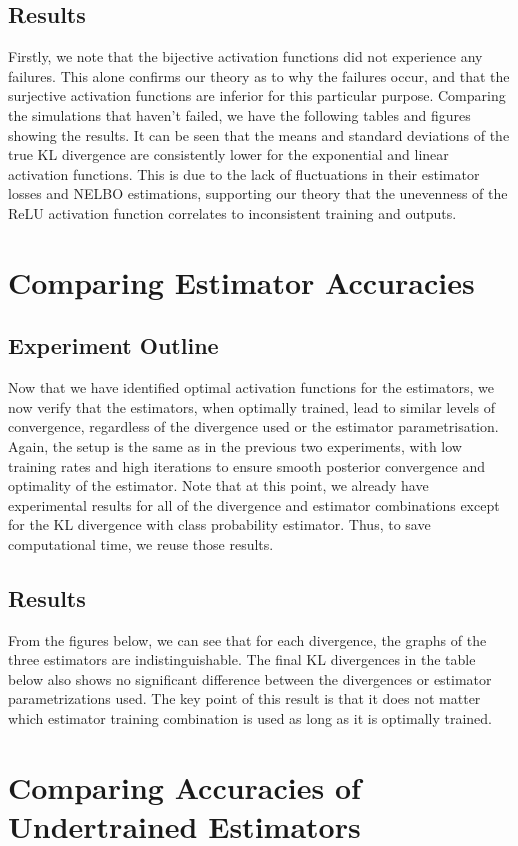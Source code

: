 \documentclass[honours,12pt]{unswthesis}
\numberwithin{equation}{section}
\theoremstyle{definition}
\begin{document}
\subsection{Results}
Firstly, we note that the bijective activation functions did not experience any failures. This alone confirms our theory as to why the failures occur, and that the surjective activation functions are inferior for this particular purpose. Comparing the simulations that haven't failed, we have the following tables and figures showing the results. It can be seen that the means and standard deviations of the true KL divergence are consistently lower for the exponential and linear activation functions. This is due to the lack of fluctuations in their estimator losses and NELBO estimations, supporting our theory that the unevenness of the ReLU activation function correlates to inconsistent training and outputs.
\newpage
\section{Comparing Estimator Accuracies}
\subsection{Experiment Outline}
Now that we have identified optimal activation functions for the estimators, we now verify that the estimators, when optimally trained, lead to similar levels of convergence, regardless of the divergence used or the estimator parametrisation. Again, the setup is the same as in the previous two experiments, with low training rates and high iterations to ensure smooth posterior convergence and optimality of the estimator. Note that at this point, we already have experimental results for all of the divergence and estimator combinations except for the KL divergence with class probability estimator. Thus, to save computational time, we reuse those results.
\subsection{Results}
From the figures below, we can see that for each divergence, the graphs of the three estimators are indistinguishable. The final KL divergences in the table below also shows no significant difference between the divergences or estimator parametrizations used. The key point of this result is that it does not matter which estimator training combination is used as long as it is optimally trained.
\newpage
\section{Comparing Accuracies of Undertrained Estimators}
\end{document}
